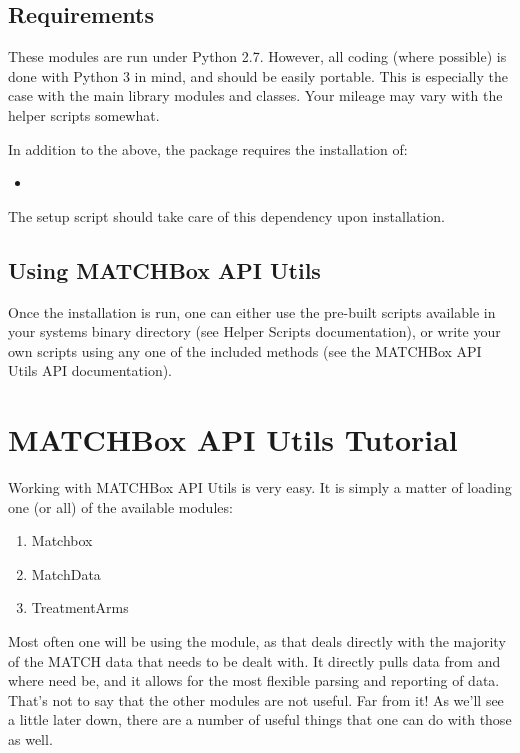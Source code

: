 \documentclass[letterpaper,10pt,english]{sphinxmanual}
\begin{document}
\section{Requirements}
\label{\detokenize{intro:requirements}}
These modules are run under Python 2.7.  However, all coding (where possible) is
done with Python 3 in mind, and should be easily portable. This is especially the
case with the main library modules and classes.  Your mileage may vary with the
helper scripts somewhat.

In addition to the above, the package requires the installation of:
\begin{itemize}
\item {} 

\end{itemize}

The setup script should take care of this dependency upon installation.


\section{Using MATCHBox API Utils}
\label{\detokenize{intro:using-matchbox-api-utils}}
Once the installation is run, one can either use the pre-built scripts available
in your systems binary directory (see Helper Scripts documentation), or write
your own scripts using any one of the included methods (see the MATCHBox API Utils
API documentation).


\chapter{MATCHBox API Utils Tutorial}
\label{\detokenize{tutorial:matchbox-api-utils-tutorial}}\label{\detokenize{tutorial::doc}}
Working with MATCHBox API Utils is very easy.  It is simply a matter of loading one
(or all) of the available modules:
\begin{enumerate}
\item {} 
Matchbox

\item {} 
MatchData

\item {} 
TreatmentArms

\end{enumerate}

Most often one will be using the  module, as that deals directly
with the majority of the MATCH data that needs to be dealt with.  It directly pulls
data from  and  where need be, and it allows for the
most flexible parsing and reporting of data.  That’s not to say that the other
modules are not useful.  Far from it!  As we’ll see a little later down, there are
a number of useful things that one can do with those as well.
\end{document}

